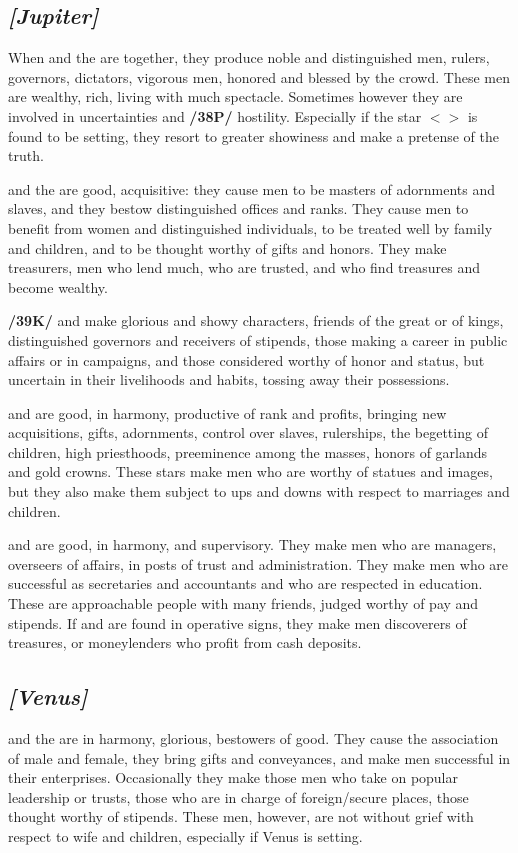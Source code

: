 \secbr
\subsection{\textit{[Jupiter]}}
When \Jupiter\xspace and the \Sun\xspace are together, they produce noble and distinguished men, rulers, governors,
dictators, vigorous men, honored and blessed by the crowd. These men are wealthy, rich, living with much spectacle. Sometimes however they are involved in uncertainties and \textbf{/38P/} hostility. Especially if the star $<$\Jupiter$>$ is found to be setting, they resort to greater showiness and make a pretense of the truth.

\Jupiter\xspace and the \Moon\xspace are good, acquisitive: they cause men to be masters of adornments and slaves, and they bestow distinguished offices and ranks. They cause men to benefit from women and distinguished individuals, to be treated well by family and children, and to be thought worthy of gifts and honors. They make treasurers, men who lend much, who are trusted, and who find treasures and become wealthy.

\textbf{/39K/}\Jupiter\xspace and \Mars\xspace make glorious and showy characters, friends of the great or of kings,
distinguished governors and receivers of stipends, those making a career in public affairs or in campaigns, and those considered worthy of honor and status, but uncertain in their livelihoods and habits, tossing away their possessions.

\Jupiter\xspace and \Venus\xspace are good, in harmony, productive of rank and profits, bringing new acquisitions,
gifts, adornments, control over slaves, rulerships, the begetting of children, high priesthoods, preeminence among the masses, honors of garlands and gold crowns. These stars make men who are worthy of statues and images, but they also make them subject to ups and downs with respect to marriages and children.

\Jupiter\xspace and \Mercury\xspace are good, in harmony, and supervisory. They make men who are managers, overseers of affairs, in posts of trust and administration. They make men who are successful as secretaries and accountants and who are respected in education. These are approachable people with many friends, judged worthy of pay and stipends. If \Jupiter\xspace and \Mercury\xspace are found in operative signs, they make men
discoverers of treasures, or moneylenders who profit from cash deposits.

\secbr
\subsection{\textit{[Venus]}}
\Venus\xspace and the \Sun\xspace are in harmony, glorious, bestowers of good. They cause the association of male and female, they bring gifts and conveyances, and make men successful in their enterprises. Occasionally they make those men who take on popular leadership or trusts, those who are in charge of foreign/secure places, those thought worthy of stipends. These men, however, are not without grief with respect to wife and children, especially if Venus is setting.

